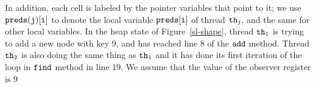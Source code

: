 In addition, each cell is labeled by the
pointer variables that point to it; we use ${\tt preds(j)[i]}$ to denote the local
variable ${\tt preds[i]}$ of thread ${\tt th}_j$, and the same for other local variables.
In the heap state of Figure~\ref{sl-shape}, thread ${\tt th}_1$ is trying to add a new node with key $9$, and has reached line $8$ of the $\tt add$ method.  Thread ${\tt th}_2$ is also doing the same thing as ${\tt th}_1$  and it has done its first iteration of the loop in $\tt find$ method in line $19$. We assume that the value of the observer register is $9$





%

%   


